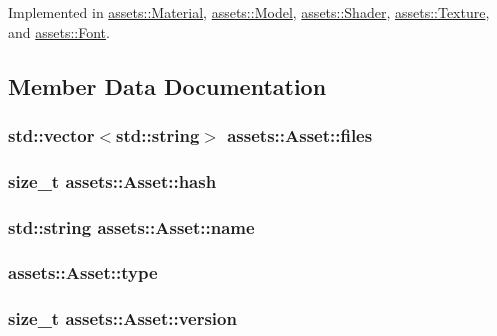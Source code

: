 Implemented in \hyperlink{classassets_1_1Material_a3aef13c20019d025b6df9d3032041e69}{assets\-::\-Material}, \hyperlink{classassets_1_1Model_af553ea8e73bfb59cb391f2d4176df8df}{assets\-::\-Model}, \hyperlink{classassets_1_1Shader_aa5d97004f3eb6185354c706afa85a10d}{assets\-::\-Shader}, \hyperlink{classassets_1_1Texture_a90ca4bef41960b8c260822d4486a0094}{assets\-::\-Texture}, and \hyperlink{classassets_1_1Font_ad844684d9e1fd08f9e77325b2ce71239}{assets\-::\-Font}.



\subsection{Member Data Documentation}
\hypertarget{classassets_1_1Asset_a54524a00f5e43b916763a4d8bf15b157}{
\subsubsection[{files}]{\setlength{\rightskip}{0pt plus 5cm}std\-::vector$<$std\-::string$>$ assets\-::\-Asset\-::files}}\label{classassets_1_1Asset_a54524a00f5e43b916763a4d8bf15b157}
\hypertarget{classassets_1_1Asset_a875aa61338fbbb28da407e389dd7a559}{
\subsubsection[{hash}]{\setlength{\rightskip}{0pt plus 5cm}size\-\_\-t assets\-::\-Asset\-::hash}}\label{classassets_1_1Asset_a875aa61338fbbb28da407e389dd7a559}
\hypertarget{classassets_1_1Asset_a57fe90e1aa9281f2dd59041dffcc74b4}{
\subsubsection[{name}]{\setlength{\rightskip}{0pt plus 5cm}std\-::string assets\-::\-Asset\-::name}}\label{classassets_1_1Asset_a57fe90e1aa9281f2dd59041dffcc74b4}
\hypertarget{classassets_1_1Asset_a80a9f5f4cab8e41e4b9cf69f5eb2986a}{
\subsubsection[{type}]{ assets\-::\-Asset\-::type}}\label{classassets_1_1Asset_a80a9f5f4cab8e41e4b9cf69f5eb2986a}
\hypertarget{classassets_1_1Asset_a631640043afcf9327d3cf20a8356a687}{
\subsubsection[{version}]{\setlength{\rightskip}{0pt plus 5cm}size\-\_\-t assets\-::\-Asset\-::version}}\label{classassets_1_1Asset_a631640043afcf9327d3cf20a8356a687}


